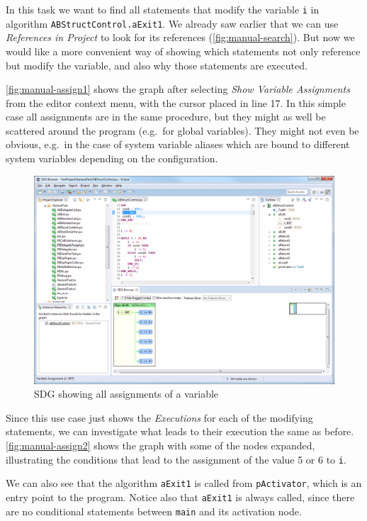 In this task we want to find all statements that modify the variable \lstinline|i| in algorithm 
\lstinline|ABStructControl.aExit1|. We already saw earlier that we can use \emph{References in Project} to look for its 
references (\autoref{fig:manual-search}). But now we would like a more convenient way of showing which statements not 
only reference but modify the variable, and also why those statements are executed.

\autoref{fig:manual-assign1} shows the graph after selecting \emph{Show Variable Assignments} from the editor context 
menu, with the cursor placed in line 17. In this simple case all assignments are in the same procedure, but they might 
as well be scattered around the program (e.g.\ for global variables). They might not even be obvious, e.g.\ in the case 
of system variable aliases which are bound to different system variables depending on the configuration.

\begin{figure}[hpb]
  \centering
    \includegraphics[width=\textwidth]{bilder/manual-assign1}
  \caption{SDG showing all assignments of a variable}
  \label{fig:manual-assign1}
\end{figure}

Since this use case just shows the \emph{Executions} for each of the modifying statements, we can investigate what 
leads to their execution the same as before. \autoref{fig:manual-assign2} shows the graph with some of the nodes 
expanded, illustrating the conditions that lead to the assignment of the value 5 or 6 to \lstinline|i|.

We can also see that the algorithm \lstinline|aExit1| is called from \lstinline|pActivator|, which is an entry point to 
the program. Notice also that \lstinline|aExit1| is always called, since there are no conditional statements between 
\lstinline|main| and its activation node.

